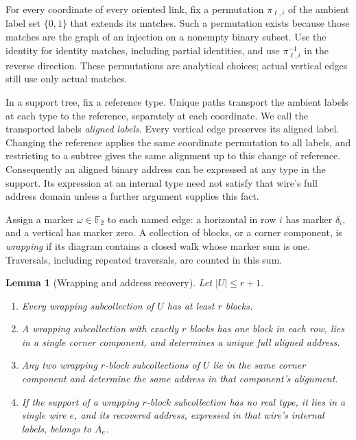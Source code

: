 \documentclass[11pt]{article}
\newtheorem{lemma}[theorem]{Lemma}
\theoremstyle{definition}
\begin{document}
For every coordinate of every oriented link, fix a permutation
\(\pi_{\ell,i}\) of the ambient label set \(\{0,1\}\) that extends its
matches. Such a permutation exists because those matches are the graph
of an injection on a nonempty binary subset. Use the identity for
identity matches, including partial identities, and use
\(\pi_{\ell,i}^{-1}\) in the reverse direction. These permutations are
analytical choices; actual vertical edges still use only actual matches.

In a support tree, fix a reference type. Unique paths transport the
ambient labels at each type to the reference, separately at each
coordinate. We call the transported labels \emph{aligned labels}.
Every vertical edge preserves its aligned label. Changing the reference
applies the same coordinate permutation to all labels, and restricting
to a subtree gives the same alignment up to this change of reference.
Consequently an aligned binary address can be expressed at any type in
the support. Its expression at an internal type need not satisfy that
wire's full address domain unless a further argument supplies this fact.

Assign a marker \(\omega\in\mathbb F_2\) to each named edge: a horizontal in row
\(i\) has marker \(\delta_i\), and a vertical has marker zero.
A collection of blocks, or a corner component, is \emph{wrapping} if its
diagram contains a closed walk whose marker sum is one. Traversals,
including repeated traversals, are counted in this sum.

\begin{lemma}[Wrapping and address recovery]
\label{offset:lem-wrapping}
Let \(\left\lvert{U}\right\rvert\le r+1\).
\begin{enumerate}
 \item Every wrapping subcollection of \(U\) has at least \(r\) blocks.
 \item A wrapping subcollection with exactly \(r\) blocks has one block
 in each row, lies in a single corner component, and determines a unique
 full aligned address.
 \item Any two wrapping \(r\)-block subcollections of \(U\) lie in the
 same corner component and determine the same address in that
 component's alignment.
 \item If the support of a wrapping \(r\)-block subcollection has no real
 type, it lies in a single wire \(e\), and its recovered address,
 expressed in that wire's internal labels, belongs to \(A_e\).
\end{enumerate}
\end{lemma}
\end{document}
